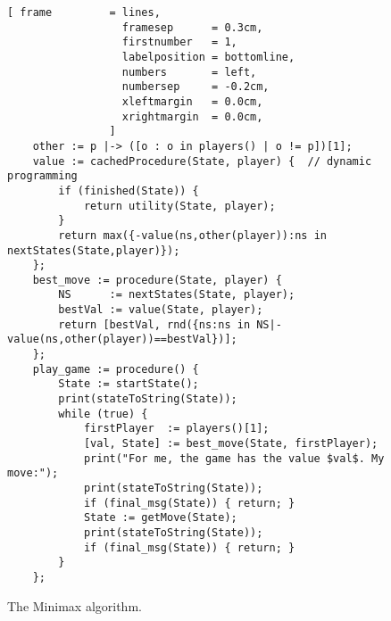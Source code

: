 \begin{figure}[!ht]
\centering
\begin{Verbatim}[ frame         = lines, 
                  framesep      = 0.3cm, 
                  firstnumber   = 1,
                  labelposition = bottomline,
                  numbers       = left,
                  numbersep     = -0.2cm,
                  xleftmargin   = 0.0cm,
                  xrightmargin  = 0.0cm,
                ]
    other := p |-> ([o : o in players() | o != p])[1];
    value := cachedProcedure(State, player) {  // dynamic programming
        if (finished(State)) {
            return utility(State, player);
        }
        return max({-value(ns,other(player)):ns in nextStates(State,player)});
    };
    best_move := procedure(State, player) {
        NS      := nextStates(State, player);
        bestVal := value(State, player);
        return [bestVal, rnd({ns:ns in NS|-value(ns,other(player))==bestVal})];
    };
    play_game := procedure() {
        State := startState();
        print(stateToString(State));
        while (true) {
            firstPlayer  := players()[1];
            [val, State] := best_move(State, firstPlayer);
            print("For me, the game has the value $val$. My move:");
            print(stateToString(State));
            if (final_msg(State)) { return; }
            State := getMove(State);
            print(stateToString(State));
            if (final_msg(State)) { return; }
        }
    };
\end{Verbatim}
\vspace*{-0.3cm}
\caption{The Minimax algorithm.}
\label{fig:game.stlx}
\end{figure}
